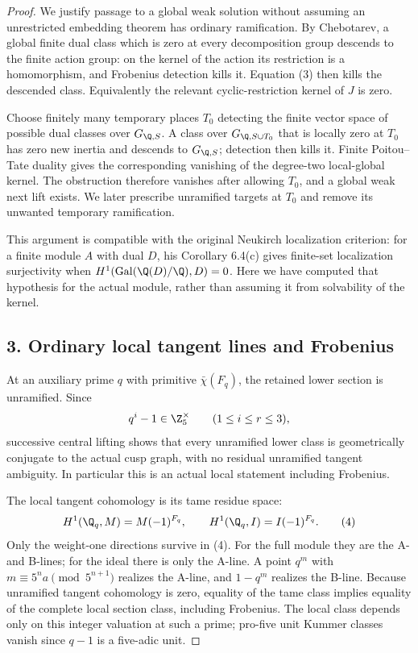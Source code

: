 \begin{proof}
We justify passage to a global weak solution without assuming an unrestricted embedding theorem has ordinary ramification. By Chebotarev, a global finite dual class which is zero at every decomposition group descends to the finite action group: on the kernel of the action its restriction is a homomorphism, and Frobenius detection kills it. Equation (3) then kills the descended class. Equivalently the relevant cyclic-restriction kernel of $J$ is zero.

Choose finitely many temporary places $T_0$ detecting the finite vector space of possible dual classes over $G_{\Q,S}$. A class over $G_{\Q,S\cup T_0}$ that is locally zero at $T_0$ has zero new inertia and descends to $G_{\Q,S}$; detection then kills it. Finite Poitou--Tate duality gives the corresponding vanishing of the degree-two local-global kernel. The obstruction therefore vanishes after allowing $T_0$, and a global weak next lift exists. We later prescribe unramified targets at $T_0$ and remove its unwanted temporary ramification.

This argument is compatible with the original Neukirch localization criterion: for a finite module $A$ with dual $D$, his Corollary 6.4(c) gives finite-set localization surjectivity when $H^1(\operatorname{Gal}(\Q(D)/\Q),D)=0$. Here we have computed that hypothesis for the actual module, rather than assuming it from solvability of the kernel.

\subsection*{3. Ordinary local tangent lines and Frobenius}
At an auxiliary prime $q$ with primitive $\bar\chi(F_q)$, the retained lower section is unramified. Since
\[
 q^i-1\in\Z_5^\times\qquad(1\le i\le r\le3),
\]
successive central lifting shows that every unramified lower class is geometrically conjugate to the actual cusp graph, with no residual unramified tangent ambiguity. In particular this is an actual local statement including Frobenius.

The local tangent cohomology is its tame residue space:
\[
 H^1(\Q_q,M)=M(-1)^{F_q},\qquad
 H^1(\Q_q,I)=I(-1)^{F_q}.
 \tag{4}
\]
Only the weight-one directions survive in (4). For the full module they are the A- and B-lines; for the ideal there is only the A-line. A point $q^m$ with $m\equiv5^n a\pmod{5^{n+1}}$ realizes the A-line, and $1-q^m$ realizes the B-line. Because unramified tangent cohomology is zero, equality of the tame class implies equality of the complete local section class, including Frobenius. The local class depends only on this integer valuation at such a prime; pro-five unit Kummer classes vanish since $q-1$ is a five-adic unit.


\end{proof}

